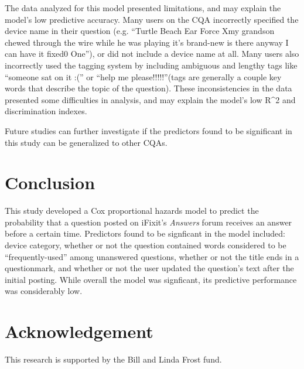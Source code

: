 \documentclass{article}
\begin{document}
The data analyzed for this model presented limitations, and may explain the model's low predictive accuracy. Many users on the CQA incorrectly specified the device name in their question (e.g. ``Turtle Beach Ear Force Xmy grandson chewed through the wire while he was playing it's brand-new is there anyway I can have it fixed0 One''), or did not include a device name at all. Many users also incorrectly used the tagging system by including ambiguous and lengthy tags like ``someone sat on it :('' or ``help me please!!!!!''(tags are generally a couple key words that describe the topic of the question). These inconsistencies in the data presented some difficulties in analysis, and may explain the model's low R^2 and discrimination indexes. 

Future studies can further investigate if the predictors found to be significant in this study can be generalized to other CQAs. 



\section*{Conclusion}

This study developed a Cox proportional hazards model to predict the probability that a question posted on iFixit's \textit{Answers} forum receives an answer before a certain time. Predictors found to be signficant in the model included: device category, whether or not the question contained words considered to be ``frequently-used'' among unanswered questions, whether or not the title ends in a questionmark, and whether or not the user updated the question's text after the initial posting. While overall the model was signficant, its predictive performance was considerably low. 




\section*{Acknowledgement}

This research is supported by the Bill and Linda Frost fund. 
\end{document}
